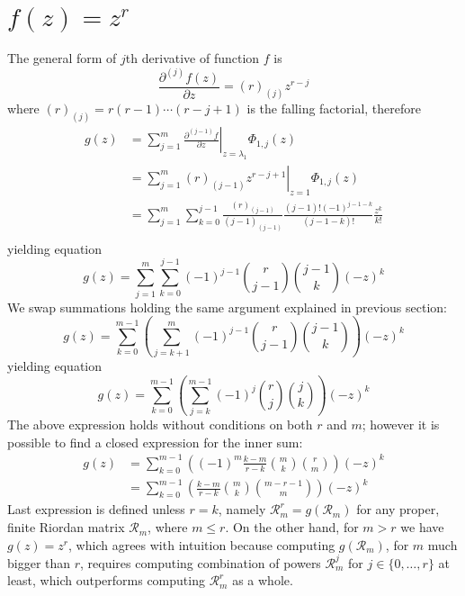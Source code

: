 \section{$f(z)=z^{r}$}

The general form of $j$th derivative of function $f$ is 
$$\frac{\partial^{(j)}{f}(z)}{\partial{z}} = (r)_{(j)} z^{r-j}$$ 
where $(r)_{(j)} = r(r-1)\cdots(r-j+1)$ is the falling factorial, therefore
\begin{displaymath}
\begin{split}
  g(z) &= \sum_{j=1}^{m}{ \left. \frac{\partial^{(j-1)}{f}}{\partial{z}} \right|_{z=\lambda_{1}}\Phi_{1,j}(z)} \\
       &= \sum_{j=1}^{m}{ \left. (r)_{(j-1)} z^{r-j+1} \right|_{z=1}\Phi_{1,j}(z)} \\
       &= \sum_{j=1}^{m}{\sum_{k=0}^{j-1}{\frac{(r)_{(j-1)}}{(j-1)_{(j-1)}}\frac{(j-1)!(-1)^{j-1-k}}{(j-1-k)!}\frac{z^{k}}{k!}}} \\
\end{split}
\end{displaymath}
yielding equation
\begin{equation}
  g(z) = \sum_{j=1}^{m}{\sum_{k=0}^{j-1}{(-1)^{j-1}{{r}\choose{j-1}}{{j-1}\choose{k}}(-z)^{k}}} 
\end{equation}
We swap summations holding the same argument explained in previous section:
\begin{displaymath}
  g(z) = \sum_{k=0}^{m-1}{\left(\sum_{j=k+1}^{m}{(-1)^{j-1}{{r}\choose{j-1}}{{j-1}\choose{k}}}\right)(-z)^{k}}
\end{displaymath}
yielding equation
\begin{equation}
  g(z) = \sum_{k=0}^{m-1}{\left(\sum_{j=k}^{m-1}{(-1)^{j}{{r}\choose{j}}{{j}\choose{k}}}\right)(-z)^{k}}
\end{equation}
The above expression holds without conditions on both $r$ and $m$; however it is possible 
to find a closed expression for the inner sum:
\begin{eqnarray}
  g(z) &= \sum_{k=0}^{m-1}{\left(\left(-1\right)^{m}\frac{ k - m }{r-k}{\binom{m}{k}} {\binom{r}{m}}\right)(-z)^{k}}\\
       &= \sum_{k=0}^{m-1}{\left(\frac{ k - m }{r-k}{\binom{m}{k}} {\binom{m-r-1}{m}}\right)(-z)^{k}}
\end{eqnarray}
Last expression is defined unless $r=k$, namely $\mathcal{R}_{m}^{r}=g(\mathcal{R}_{m})$ for any proper, 
finite Riordan matrix $\mathcal{R}_{m}$, where $m\leq r$. On the other hand, for $m>r$ we have 
$g(z)=z^{r}$, which agrees with intuition because computing $g(\mathcal{R}_{m})$, for $m$ much bigger than $r$, 
requires computing combination of powers $\mathcal{R}_{m}^{j}$ for $j\in \lbrace 0,\ldots,r \rbrace$ at least,
which outperforms computing $\mathcal{R}_{m}^{r}$ as a whole.

